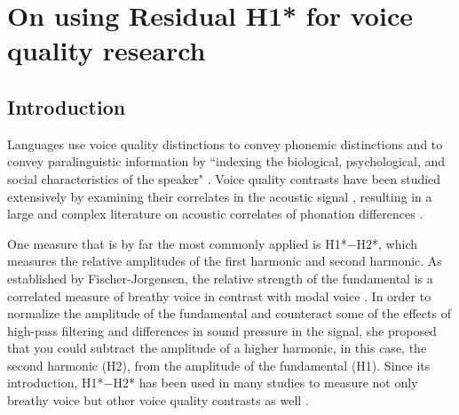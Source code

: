 
\chapter{On using Residual H1* for voice quality research} \label{ch:residual_h1}
\section{Introduction} \label{sec:Intro}

Languages use voice quality distinctions to convey phonemic distinctions \citep{garellekPhoneticsVoice2019} and to convey paralinguistic information by ``indexing the biological, psychological, and social characteristics of the speaker" \citep{laverVoiceQualityIndexical1968,podesvaStanceWindowLanguageRace2016}. Voice quality contrasts have been studied extensively by examining their correlates in the acoustic signal \citep[e.g.,][]{espositoCrossLinguisticPatterns2020}, resulting in a large and complex literature on acoustic correlates of phonation differences \citep[see][]{garellekPhoneticsVoice2019}. 

One measure that is by far the most commonly applied is H1*$-$H2*, which measures the relative amplitudes of the first harmonic and second harmonic. As established by Fischer-Jorgensen, the relative strength of the fundamental is a correlated measure of breathy voice in contrast with modal voice \citet{fischer-jorgensenPhoneticAnalysisBreathy1968}. In order to normalize the amplitude of the fundamental and counteract some of the effects of high-pass filtering and differences in sound pressure in the signal, she proposed that you could subtract the amplitude of a higher harmonic, in this case, the second harmonic (H2), from the amplitude of the fundamental (H1). Since its introduction, H1*$-$H2* has been used in many studies to measure not only breathy voice but other voice quality contrasts as well \citep{garellekPhoneticsVoice2019,chaiH1H2Acoustic2022}.

